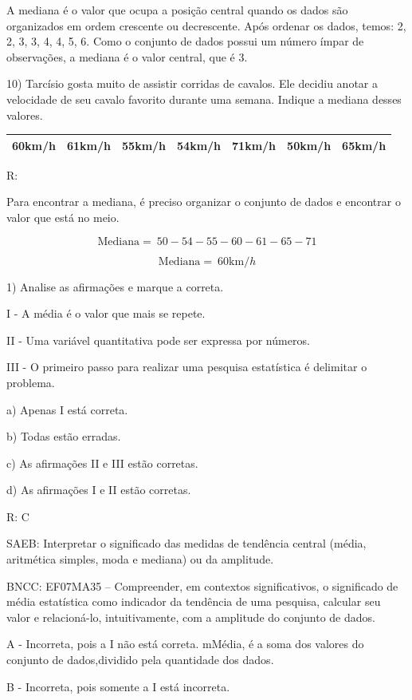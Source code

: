 A mediana é o valor que ocupa a posição central quando os dados são
organizados em ordem crescente ou decrescente. Após ordenar os dados,
temos: 2, 2, 3, 3, 4, 4, 5, 6. Como o conjunto de dados possui um número
ímpar de observações, a mediana é o valor central, que é 3.

10) Tarcísio gosta muito de assistir corridas de cavalos. Ele decidiu
anotar a velocidade de seu cavalo favorito durante uma semana. Indique a
mediana desses valores.

\begin{longtable}[]{@{}lllllll@{}}
\toprule
\endhead
60km/h & 61km/h & 55km/h & 54km/h & 71km/h & 50km/h &
65km/h\tabularnewline
\bottomrule
\end{longtable}

R:

Para encontrar a mediana, é preciso organizar o conjunto de dados e
encontrar o valor que está no meio.

\[\text{Mediana} = \ 50 - 54 - 55 - 60 - 61 - 65 - 71\]

\[\text{Mediana} = \ 60\text{km}/h\]


1) Analise as afirmações e marque a correta.

I - A média é o valor que mais se repete.

II - Uma variável quantitativa pode ser expressa por números.

III - O primeiro passo para realizar uma pesquisa estatística é
delimitar o problema.

a) Apenas I está correta.

b) Todas estão erradas.

c) As afirmações II e III estão corretas.

d) As afirmações I e II estão corretas.

R: C

SAEB: Interpretar o significado das medidas de tendência central (média,
aritmética simples, moda e mediana) ou da amplitude.

BNCC: EF07MA35 -- Compreender, em contextos significativos, o
significado de média estatística como indicador da tendência de uma
pesquisa, calcular seu valor e relacioná-lo, intuitivamente, com a
amplitude do conjunto de dados.

A - Incorreta, pois a I não está correta. mMédia, é a soma dos valores
do conjunto de dados,dividido pela quantidade dos dados.

B - Incorreta, pois somente a I está incorreta.

